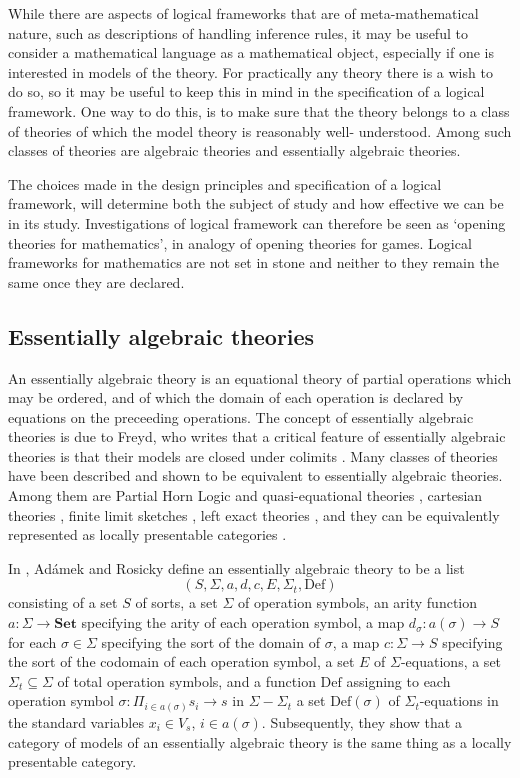 While there are aspects of logical frameworks that are of meta-mathematical 
nature, such as descriptions of handling inference rules, it may be useful to
consider a mathematical language as a mathematical object, especially if one
is interested in models of the theory. For practically any theory there is a
wish to do so, so it may be useful to keep this in mind in the specification
of a logical framework. One way to do this, is to make sure that the theory
belongs to a class of theories of which the model theory is reasonably well-%
understood. Among such classes of theories are algebraic theories and
essentially algebraic theories.

The choices made in the design principles and specification of a logical 
framework, will determine both the subject of study and how effective we can be
in its study. Investigations of logical framework can therefore be seen as
`opening theories for mathematics', in analogy of opening theories for games.
Logical frameworks for mathematics are not set in stone and 
neither to they remain the same once they are declared.

\subsection*{Essentially algebraic theories}
An essentially algebraic theory is an equational theory of partial operations
which may be ordered, and of which the domain of each operation is declared by 
equations on the preceeding operations. The concept of essentially algebraic
theories is due to Freyd, who writes that a critical feature of essentially
algebraic theories is that their models are closed under 
colimits \cite{Aspects_of_topoi}. Many classes of theories have been described
and shown to be equivalent to essentially algebraic theories. Among them are
Partial Horn Logic and quasi-equational theories \cite{Palmgren_Vickers},
cartesian theories \cite{Freyd2002}, finite limit sketches 
\cite{Toposes_triples_theories}, left exact theories
\cite{McLarty1986}, and they can be equivalently represented as locally
presentable categories \cite{Adamek_Locally}.

In \cite{Adamek_Locally}, Ad\'amek and Rosicky
define an essentially algebraic theory to be a list 
\begin{equation*}
(S,\Sigma,a,d,c,E,\Sigma_t,\mathrm{Def})
\end{equation*} 
consisting of a set $S$ of sorts, a set $\Sigma$ of operation symbols,
an arity function $a:\Sigma\to\mathbf{Set}$ specifying the arity of each operation
symbol, a map $d_\sigma:a(\sigma)\to S$
for each $\sigma\in\Sigma$ specifying the sort of the domain of $\sigma$,
a map $c:\Sigma\to S$ specifying the sort of the codomain of each operation
symbol,
a set $E$ of $\Sigma$-equations, a set $\Sigma_t\subseteq\Sigma$ of total
operation symbols, and a function $\mathrm{Def}$ assigning to each operation
symbol $\sigma:\Pi_{i\in a(\sigma)} s_i\to s$ in $\Sigma-\Sigma_t$ a set
$\mathrm{Def}(\sigma)$ of $\Sigma_t$-equations in the standard variables
$x_i\in V_s$, $i\in a(\sigma)$. Subsequently, they show that a category of models of an
essentially algebraic theory is the same thing as a locally presentable 
category.

